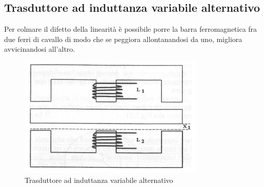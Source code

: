 \subsection{Trasduttore ad induttanza variabile alternativo}
Per colmare il difetto della linearità è possibile porre la barra
ferromagnetica fra due ferri di cavallo di modo che se peggiora
allontanandosi da uno, migliora avvicinandosi all'altro.

\begin{figure}[htbp]
	\centering
	\includegraphics[scale=0.5]
			{img/induttanza-variabile-2.png}
	\caption{Trasduttore ad induttanza
variabile alternativo\label{fig:trasdifffase}}
\end{figure}